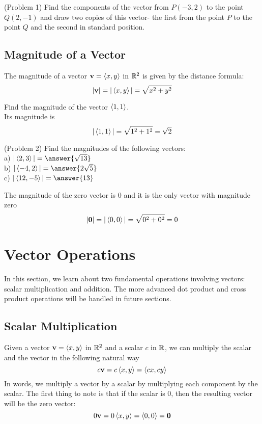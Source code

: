 \documentclass[handout]{ximera}
\begin{document}
\begin{problem}(Problem 1)
Find the components of the vector from $P(-3, 2)$ to the point $Q(2, -1)$ and draw two copies of this vector- the first from the point $P$ to the point $Q$
and the second in standard position.\\
\end{problem}


\subsection{Magnitude of a Vector}

The magnitude of a vector $\mathbf{v} = \left\langle x,y\right\rangle$ in $\mathbb R^2$ is given by the distance formula:
\[
|\mathbf{v}| = |\left\langle x,y\right\rangle| = \sqrt{x^2 +y^2}
\]

\begin{example}[Example 2]
Find the magnitude of the vector $\left\langle 1,1\right\rangle$.\\
Its magnitude is
\[
|\left\langle 1,1\right\rangle| = \sqrt{1^2 +1^2} = \sqrt 2
\]
\end{example}

\begin{problem}(Problem 2)
Find the magnitudes of the following vectors:\\
a) $|\vector{2,3}| = \answer{\sqrt{13}}$\\
b) $|\vector{-4,2}| = \answer{2\sqrt{5}}$\\
c) $|\vector{12,-5}| = \answer{13}$
\end{problem}

The magnitude of the zero vector is $0$ and it is the only vector with magnitude zero
\[
|\mathbf{0}| = |\left\langle 0,0\right\rangle| = \sqrt{0^2 +0^2} = 0
\]

\section{Vector Operations}
In this section, we learn about two fundamental operations involving vectors: scalar multiplication and addition.
The more advanced dot product and cross product operations will be handled in future sections.

\subsection{Scalar Multiplication}
Given a vector $\mathbf{v} = \left\langle x,y\right\rangle$ in $\mathbb R^2$ and a scalar $c$ in $\mathbb R$, we can multiply the scalar and the vector in the following
natural way
\[
c\mathbf{v} = c\left\langle x,y\right\rangle = \left\langle cx,cy\right\rangle
\]
In words, we multiply a vector by a scalar by multiplying each component by the scalar.
The first thing to note is that if the scalar is 0, then the resulting vector will be the zero vector:
\[
0\mathbf{v} = 0\left\langle x,y\right\rangle = \left\langle 0,0\right\rangle = \mathbf{0}
\]
\end{document}
